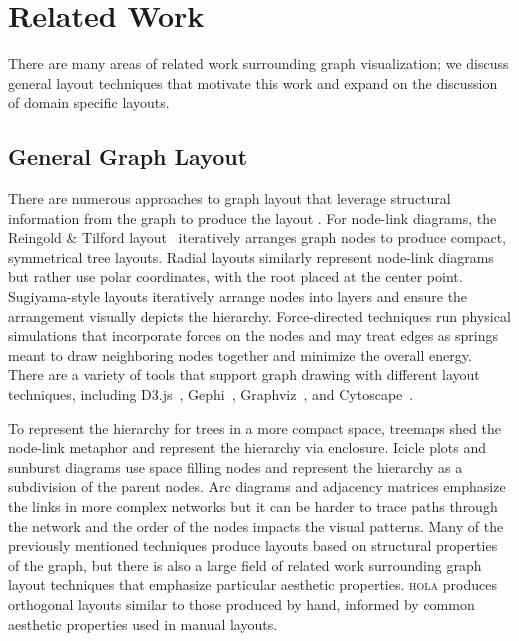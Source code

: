 \section{Related Work}
There are many areas of related work surrounding graph visualization; we
discuss general layout techniques that motivate this work and expand on the
discussion of domain specific layouts.

\subsection{General Graph Layout}
There are numerous approaches to graph layout that leverage structural
information from the graph to produce the layout \cite{herman2000graph,eades2010graph,gibson2013survey}.
For node-link diagrams, the Reingold \& Tilford layout~\cite{reingold1981tidier}
iteratively arranges graph nodes to produce compact, symmetrical tree layouts.
Radial layouts  similarly represent node-link diagrams but rather use polar coordinates,
with the root placed at the center point. Sugiyama-style layouts \cite{sugiyama1981methods} iteratively
arrange nodes into layers and ensure the arrangement visually depicts the hierarchy.
Force-directed techniques \cite{tutte1963draw,kobourov2012spring,quinn1979forced,fruchterman1991graph} 
run physical simulations that incorporate forces on the nodes and
may treat edges as springs meant to draw neighboring nodes
together and minimize the overall energy. 
There are a variety of tools that support graph drawing with different layout 
techniques, including D3.js~\cite{bostock:d3}, Gephi~\cite{bastian2009gephi},
Graphviz~\cite{ellson2001graphviz}, and Cytoscape~\cite{shannon2003cytoscape}.

To represent the hierarchy for trees in a more compact space, treemaps \cite{johnson1991tree}
shed the node-link metaphor and represent the hierarchy via enclosure. 
Icicle plots \cite{kruskal1983icicle} and sunburst diagrams  
use space filling nodes and represent the hierarchy as a subdivision of the parent nodes.
Arc diagrams  and adjacency matrices 
emphasize the links in more complex networks but it can be harder to trace
paths through the network and the order of the nodes impacts the visual 
patterns.
Many of the previously mentioned techniques produce layouts based on structural
properties of the graph, but there is also a large field of 
related work surrounding graph layout techniques that emphasize particular
aesthetic properties. \textsc{hola} \cite{kieffer2016hola} produces orthogonal 
layouts similar to those produced by hand, informed by common aesthetic properties 
used in manual layouts.

